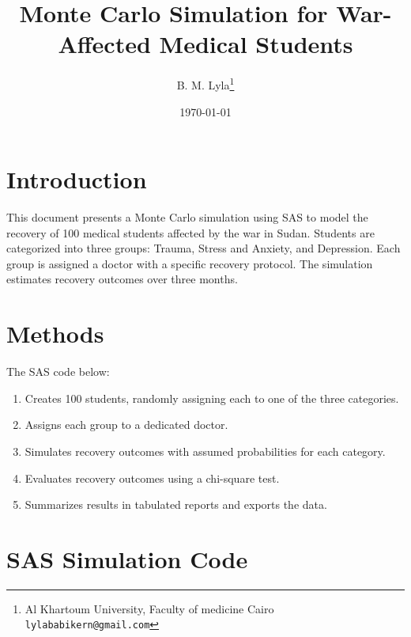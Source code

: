 \documentclass[12pt]{article}
\title{\textcolor{titleColor}{\textbf{\Huge \textbf{ Monte Carlo Simulation for War-Affected Medical Students \\ }}}}
\author{B. M. Lyla\thanks{Al Khartoum University, Faculty of medicine  Cairo \\ \texttt{lylababikern@gmail.com}}}
\date{\today}
\begin{document}
\maketitle
\section*{Introduction}

This document presents a Monte Carlo simulation using SAS to model the recovery of 100 medical students affected by the war in Sudan. Students are categorized into three groups: Trauma, Stress and Anxiety, and Depression. Each group is assigned a doctor with a specific recovery protocol. The simulation estimates recovery outcomes over three months.

\section*{Methods}

The SAS code below:
\begin{enumerate}
  \item Creates 100 students, randomly assigning each to one of the three categories.
  \item Assigns each group to a dedicated doctor.
  \item Simulates recovery outcomes with assumed probabilities for each category.
  \item Evaluates recovery outcomes using a chi-square test.
  \item Summarizes results in tabulated reports and exports the data.
\end{enumerate}

\section*{SAS Simulation Code}
\end{document}
